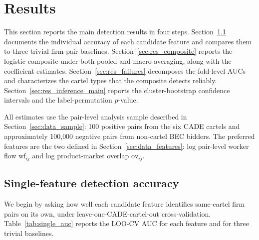 \section{Results}\label{sec:results}

This section reports the main detection results in four steps. Section~\ref{sec:res_single} documents the individual accuracy of each candidate feature and compares them to three trivial firm-pair baselines. Section~\ref{sec:res_composite} reports the logistic composite under both pooled and macro averaging, along with the coefficient estimates. Section~\ref{sec:res_failures} decomposes the fold-level AUCs and characterizes the cartel types that the composite detects reliably. Section~\ref{sec:res_inference_main} reports the cluster-bootstrap confidence intervals and the label-permutation $p$-value.

All estimates use the pair-level analysis sample described in Section~\ref{sec:data_sample}: 100 positive pairs from the six CADE cartels and approximately 100{,}000 negative pairs from non-cartel BEC bidders. The preferred features are the two defined in Section~\ref{sec:data_features}: log pair-level worker flow $\mathrm{wf}_{ij}$ and log product-market overlap $\mathrm{ov}_{ij}$.

\subsection{Single-feature detection accuracy}\label{sec:res_single}

We begin by asking how well each candidate feature identifies same-cartel firm pairs on its own, under leave-one-CADE-cartel-out cross-validation. Table~\ref{tab:single_auc} reports the LOO-CV AUC for each feature and for three trivial baselines.


